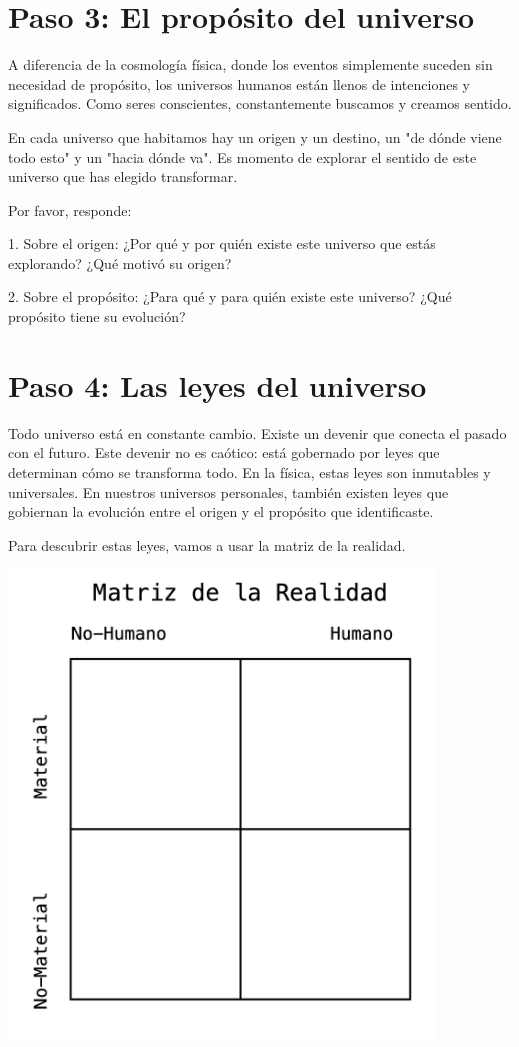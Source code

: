\documentclass[statementpaper,oneside,article,10pt]{memoir}
\begin{document}
\newpage

\section{Paso 3: El propósito del universo}

A diferencia de la cosmología física, donde los eventos simplemente suceden sin necesidad de propósito, los universos humanos están llenos de intenciones y significados. Como seres conscientes, constantemente buscamos y creamos sentido.

En cada universo que habitamos hay un origen y un destino, un "de dónde viene todo esto" y un "hacia dónde va". Es momento de explorar el sentido de este universo que has elegido transformar.

Por favor, responde:

1. Sobre el origen:
¿Por qué y por quién existe este universo que estás explorando?  ¿Qué motivó su origen?
\vspace{5cm}

2. Sobre el propósito:
¿Para qué y para quién existe este universo? ¿Qué propósito tiene su evolución?
\vspace{5cm}


\newpage
\section{Paso 4: Las leyes del universo}
Todo universo está en constante cambio. Existe un devenir que conecta el pasado con el futuro.  Este devenir no es caótico: está gobernado por leyes que determinan cómo se transforma todo. En la física, estas leyes son inmutables y universales. En nuestros universos personales, también existen leyes que gobiernan la evolución entre el origen y el propósito que identificaste.

Para descubrir estas leyes, vamos a usar la matriz de la realidad. 

\begin{center}
\includegraphics[width=0.85\textwidth]{matriz.png}
\end{center}
\end{document}
